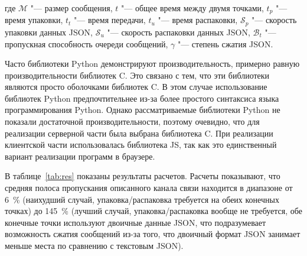 \noindent где ${\mathcal{M}}$ "--- размер сообщения, $t$ "--- общее время между двумя точками, $t_p$ "--- время упаковки, $t_t$ "--- время передачи, $t_u$ "--- время распаковки, $\mathcal{S}_p$ "--- скорость упаковки данных JSON, $\mathcal{S}_u$ "--- скорость распаковки данных JSON, $\mathcal{B}_t$ "--- пропускная способность очереди сообщений, $\gamma$ "--- степень сжатия JSON.

Часто библиотеки Python демонстрируют производительность, примерно равную производительности библиотек C. Это связано с тем, что эти библиотеки являются просто оболочками библиотек C. В этом случае использование библиотек Python предпочтительнее из-за более простого синтаксиса языка программирования Python. Однако рассматриваемые библиотеки Python не показали достаточной производительности, поэтому очевидно, что для реализации серверной части была выбрана библиотека C. При реализации клиентской части использовалась библиотека JS, так как это единственный вариант реализации программ в браузере.

В таблице~\cref{tab:res} показаны результаты расчетов. Расчеты показывают, что средняя полоса пропускания описанного канала связи находится в диапазоне от \SI{6}{\percent} (наихудший случай, упаковка/распаковка требуется на обеих конечных точках) до \SI{145}{\percent} (лучший случай, упаковка/распаковка вообще не требуется, обе конечные точки используют двоичные данные JSON, что подразумевает возможность сжатия сообщений из-за того, что двоичный формат JSON занимает меньше места по сравнению с текстовым JSON).

